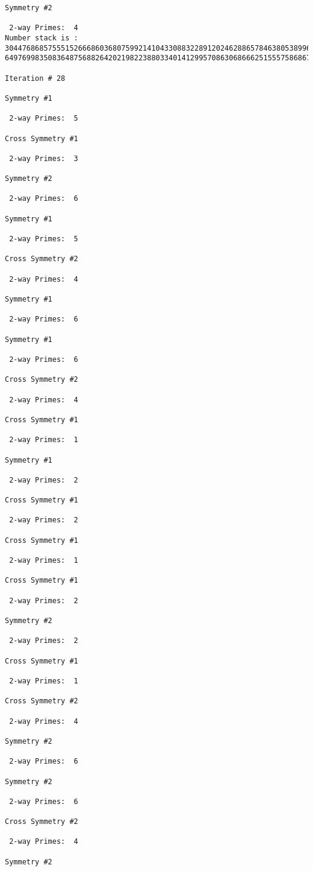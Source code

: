 \begin{verbatim}
Symmetry #2

 2-way Primes: 	4
Number stack is :
30447686857555152666860368075992141043308832289120246288657846380538996794608835958544046240163340857
64976998350836487568826420219822388033401412995708630686662515557586867440375804336104264044585953880

Iteration #	28

Symmetry #1

 2-way Primes: 	5

Cross Symmetry #1

 2-way Primes: 	3

Symmetry #2

 2-way Primes: 	6

Symmetry #1

 2-way Primes: 	5

Cross Symmetry #2

 2-way Primes: 	4

Symmetry #1

 2-way Primes: 	6

Symmetry #1

 2-way Primes: 	6

Cross Symmetry #2

 2-way Primes: 	4

Cross Symmetry #1

 2-way Primes: 	1

Symmetry #1

 2-way Primes: 	2

Cross Symmetry #1

 2-way Primes: 	2

Cross Symmetry #1

 2-way Primes: 	1

Cross Symmetry #1

 2-way Primes: 	2

Symmetry #2

 2-way Primes: 	2

Cross Symmetry #1

 2-way Primes: 	1

Cross Symmetry #2

 2-way Primes: 	4

Symmetry #2

 2-way Primes: 	6

Symmetry #2

 2-way Primes: 	6

Cross Symmetry #2

 2-way Primes: 	4

Symmetry #2


\end{verbatim}
